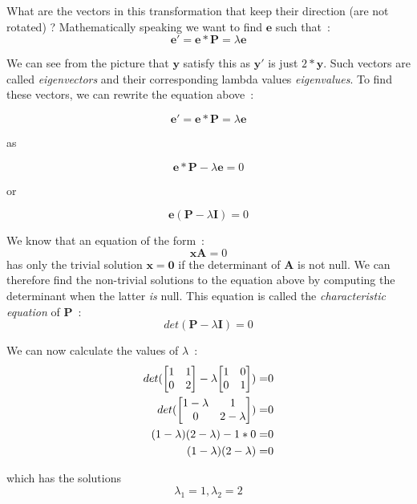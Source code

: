 \documentclass[11pt,twocolumn]{amsart} %
\newcommand{\ve}[1]{\boldsymbol{#1}}
\newcommand{\ma}[1]{\boldsymbol{#1}}
\newenvironment{m}{\begin{bmatrix}}{\end{bmatrix}}
\begin{document}
What are the vectors in this transformation that keep their direction (are not rotated) ? Mathematically speaking we want to find $\ve{e}$ such that~:
\[
  \ve{e'} = \ve{e} * \ma{P} = \lambda \ve{e}
\]

We can see from the picture that $\ve{y}$ satisfy this as $\ve{y'}$ is just $2 * \ve{y}$. Such vectors are called \emph{eigenvectors} and their corresponding lambda values \emph{eigenvalues}. To find these vectors, we can rewrite the equation above~:

\[
  \ve{e'} = \ve{e} * \ma{P} = \lambda \ve{e}
\]

as

\[
  \ve{e} * \ma{P} - \lambda \ve{e} = 0
\]

or 

\[
  \ve{e} (\ma{P} - \lambda \ma{I}) = 0  
\]

We know that an equation of the form~:
\[
  \ve{x} \ma{A} = 0
\]
has only the trivial solution $\ve{x} = \ve{0}$ if the determinant of $\ma{A}$ is not null. We can therefore find the non-trivial solutions to the equation above by computing the determinant when the latter \emph{is} null. This equation is called the \emph{characteristic equation} of $\ma{P}$~:
\[
  det(\ma{P} - \lambda \ma{I}) = 0
\]

We can now calculate the values of $\lambda$~:
\begin{align*}
  det(\begin{m} 1 & 1 \\ 0 & 2\end{m} - \lambda \begin{m} 1 & 0 \\ 0 & 1 \end{m}) = & 0 \\
  det(\begin{m} 1-\lambda & 1 \\ 0 & 2-\lambda\end{m}) = & 0 \\
  (1-\lambda)(2-\lambda) - 1 * 0 = & 0 \\
  (1-\lambda)(2-\lambda) = & 0
\end{align*}

which has the solutions
\[
\lambda_1 = 1, \lambda_2 = 2
\]
\end{document}
